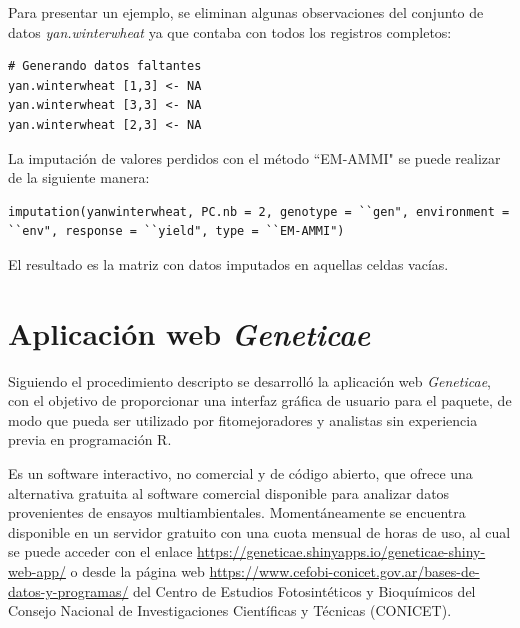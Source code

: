 Para presentar un ejemplo, se eliminan algunas observaciones del conjunto de datos \emph{yan.winterwheat} ya que contaba con todos los registros completos:

\begin{tcolorbox}[skin=bicolor,
    colframe=aurometalsaurus,colback=backcolour,colbacklower=white,
    width=1\linewidth,
    height=0.15\linewidth,
    boxsep=-3mm]
\begin{lstlisting}
# Generando datos faltantes
yan.winterwheat [1,3] <- NA
yan.winterwheat [3,3] <- NA
yan.winterwheat [2,3] <- NA
\end{lstlisting}
\end{tcolorbox}

La imputación de valores perdidos con el método ``EM-AMMI" se puede realizar de la siguiente manera:

\begin{tcolorbox}[skin=bicolor,
    colframe=aurometalsaurus,colback=backcolour,colbacklower=white,
    width=1\linewidth,
    height=0.08\linewidth,
    boxsep=-3mm]
\begin{lstlisting}
imputation(yanwinterwheat, PC.nb = 2, genotype = ``gen", environment = ``env", response = ``yield", type = ``EM-AMMI")
\end{lstlisting}
\end{tcolorbox}

El resultado es la matriz con datos imputados en aquellas celdas vacías. 

\section{Aplicación web \emph{Geneticae}}

Siguiendo el procedimiento descripto se desarrolló la aplicación web \emph{Geneticae}, con el objetivo de proporcionar una interfaz gráfica de usuario para el paquete, de modo que pueda ser utilizado por fitomejoradores y analistas sin experiencia previa en programación R. 

Es un software interactivo, no comercial y de código abierto, que ofrece una alternativa gratuita al software comercial disponible para analizar datos provenientes de ensayos multiambientales. Momentáneamente se encuentra disponible en un servidor gratuito con una cuota mensual de horas de uso, al cual se puede acceder con el enlace \url{https://geneticae.shinyapps.io/geneticae-shiny-web-app/} o desde la página web \url{https://www.cefobi-conicet.gov.ar/bases-de-datos-y-programas/} del Centro de Estudios Fotosintéticos y Bioquímicos del Consejo Nacional de Investigaciones Científicas y Técnicas (CONICET).

